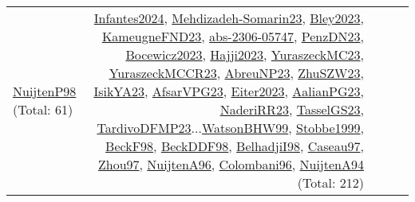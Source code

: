 {\begin{longtable}{p{3cm}r>{\raggedright\arraybackslash}p{6cm}>{\raggedright\arraybackslash}p{6cm}>{\raggedright\arraybackslash}p{8cm}}
\hyperref[detail:NuijtenP98]{NuijtenP98} (Total: 61) & \hyperref[detail:Infantes2024]{Infantes2024}, \hyperref[detail:Mehdizadeh-Somarin23]{Mehdizadeh-Somarin23}, \hyperref[detail:Bley2023]{Bley2023}, \hyperref[detail:KameugneFND23]{KameugneFND23}, \hyperref[detail:abs-2306-05747]{abs-2306-05747}, \hyperref[detail:PenzDN23]{PenzDN23}, \hyperref[detail:Bocewicz2023]{Bocewicz2023}, \hyperref[detail:Hajji2023]{Hajji2023}, \hyperref[detail:YuraszeckMC23]{YuraszeckMC23}, \hyperref[detail:YuraszeckMCCR23]{YuraszeckMCCR23}, \hyperref[detail:AbreuNP23]{AbreuNP23}, \hyperref[detail:ZhuSZW23]{ZhuSZW23}, \hyperref[detail:IsikYA23]{IsikYA23}, \hyperref[detail:AfsarVPG23]{AfsarVPG23}, \hyperref[detail:Eiter2023]{Eiter2023}, \hyperref[detail:AalianPG23]{AalianPG23}, \hyperref[detail:NaderiRR23]{NaderiRR23}, \hyperref[detail:TasselGS23]{TasselGS23}, \hyperref[detail:TardivoDFMP23]{TardivoDFMP23}...\hyperref[detail:WatsonBHW99]{WatsonBHW99}, \hyperref[detail:Stobbe1999]{Stobbe1999}, \hyperref[detail:BeckF98]{BeckF98}, \hyperref[detail:BeckDDF98]{BeckDDF98}, \hyperref[detail:BelhadjiI98]{BelhadjiI98}, \hyperref[detail:Caseau97]{Caseau97}, \hyperref[detail:Zhou97]{Zhou97}, \hyperref[detail:NuijtenA96]{NuijtenA96}, \hyperref[detail:Colombani96]{Colombani96}, \hyperref[detail:NuijtenA94]{NuijtenA94} (Total: 212)\\

\end{longtable}}
